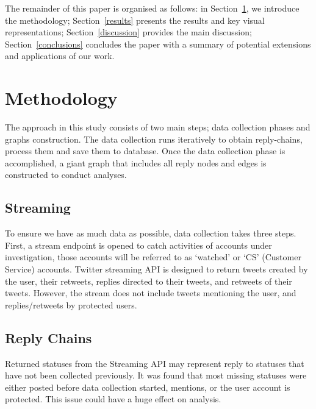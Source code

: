 \documentclass[sigconf]{acmart}
\begin{document}
The remainder of this paper is organised as follows: in
Section~\ref{method}, we introduce the methodology;
Section~\ref{results} presents the results and key visual
representations; Section~\ref{discussion} provides the main
discussion; Section~\ref{conclusions} concludes the paper with a
summary of potential extensions and applications of our work.


\section{Methodology}\label{method}

The approach in this study consists of two main steps; data
collection phases and graphs construction. The data collection
runs iteratively to obtain reply-chains, process them and save them to
database. Once the data collection phase is accomplished, a giant
graph that includes all reply nodes and edges is constructed to conduct analyses.


\subsection{Streaming}

To ensure we have as much data as possible, data collection takes
three steps. First, a stream endpoint is opened to catch activities of
accounts under investigation, those accounts will be referred to as
`watched' or `CS' (Customer Service) accounts. Twitter streaming API
is designed to return tweets created by the user, their retweets,
replies directed to their tweets, and retweets of their
tweets. However, the stream does not include tweets mentioning the
user, and replies/retweets by protected users. 

\subsection{Reply Chains}

Returned statuses from the Streaming API may represent reply to
statuses that have not been collected previously. It was found that most
missing statuses were either posted before data collection started, mentions, 
or the user account is protected. This issue could have a huge effect on 
analysis. 
\end{document}

